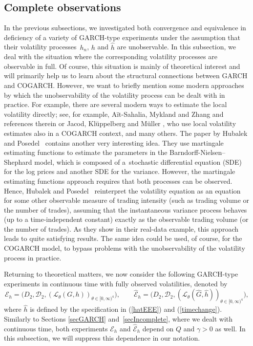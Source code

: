 \documentclass[number,citesort,seceqn,dvips]{arxbj}
\newcommand{\eqref}[1]{(\ref{#1})}
\newcommand{\DDD}{{\mathcal D}}
\newcommand{\EEE}{{\mathcal E}}
\newcommand{\LLL}{{\mathcal L}}
\begin{document}
\vspace*{-2pt}\subsection{Complete observations}\vspace*{-2pt}\label{secComplete}
In the previous
subsections, we investigated both convergence and equivalence in
deficiency of a variety of GARCH-type experiments under the
assumption
that their volatility processes~$h_n$,\vadjust{\goodbreak} $h$ and $\hat h$ are
unobservable. In this subsection, we deal with the situation where the
corresponding volatility processes are observable in full. Of course,
this situation is mainly of theoretical interest and will primarily
help us to learn about the structural connections between GARCH and
COGARCH. However, we want to briefly mention some modern approaches by
which the unobservability of the volatility process can be dealt with
in practice. For example, there are several modern ways to estimate the
local volatility directly; see, for example, A{\"{i}}t-Sahalia, Mykland
and Zhang \cite{AMZh} and references therein or Jacod,
Kl\"{u}ppelberg and M\"{u}ller \cite{JaKlMu}, who use local
volatility estimates also in a COGARCH context, and many others. The
paper by Hubalek and Posedel~\cite{HubPos} contains another
very interesting idea. They use martingale estimating functions to
estimate the parameters in the Barndorff-Nielsen--Shephard model, which
is composed of a~stochastic differential equation (SDE) for the log
prices and another SDE for the variance. However, the martingale
estimating functions approach requires that both processes can be
observed. Hence, Hubalek and Posedel~\cite{HubPos} reinterpret the volatility
equation as an equation for some other observable measure of trading
intensity (such as trading volume or the number of trades), assuming
that the instantaneous variance process behaves (up to a
time-independent constant) exactly as the observable trading volume (or
the number of trades). As they show in their real-data example, this
approach leads to quite satisfying results. The same idea could be
used, of course, for the COGARCH model, to bypass problems with the
unobservability of the volatility process in practice.

Returning to theoretical matters, we now consider the following
GARCH-type experiments in continuous time with fully observed
volatilities, denoted by
%
\[
\EEE_h= \bigl(D_2,\DDD_2, (\LLL_{\theta}(G,h) )_{\theta\in
[0,\infty)^4} \bigr),\qquad
\widehat\EEE_h= \bigl(D_2,\DDD_2, (\LLL_{\theta}(\widehat
G,\hat
h) )_{\theta\in[0,\infty)^4} \bigr) ,
\]
%
where $\hat h$ is defined by the specification in \eqref{hatEEE}
and \eqref{timechange}. Similarly to
Sections \ref{secGARCH} and~\ref{secIncomplete}, where we dealt with
continuous time, both experiments $\EEE_h$ and $\widehat\EEE_h$
depend on $Q$ and $\gamma>0$ as well. In this subsection, we will
suppress this dependence in our notation.
\end{document}
